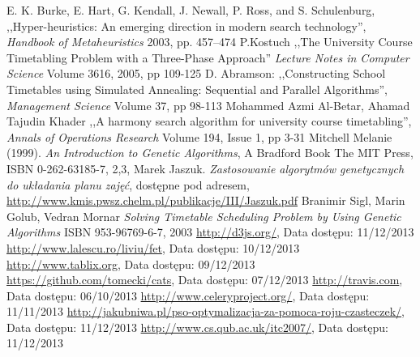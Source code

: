 \documentclass[11pt]{report}
\begin{document}
\begin{thebibliography}{2}
 E. K. Burke, E. Hart, G. Kendall, J. Newall, P. Ross, and S. Schulenburg, ,,Hyper-heuristics: An emerging direction in modern search technology'', \emph{Handbook of Metaheuristics } 2003, pp. 457–474
 P.Kostuch ,,The University Course Timetabling Problem with a Three-Phase Approach'' \emph{
Lecture Notes in Computer Science} Volume 3616, 2005, pp 109-125
 D. Abramson: ,,Constructing School Timetables using Simulated Annealing: Sequential and Parallel Algorithms'', \emph{Management Science} Volume 37, pp 98-113
  Mohammed Azmi Al-Betar, Ahamad Tajudin Khader ,,A harmony search algorithm for university course timetabling'',  
\emph{Annals of Operations Research} Volume 194, Issue 1, pp 3-31 
 Mitchell Melanie (1999). \emph{An Introduction to Genetic Algorithms}, A Bradford Book The MIT Press, ISBN 0-262-63185-7, 2,3,
 Marek Jaszuk. \emph{Zastosowanie algorytmów genetycznych do układania planu zajęć}, dostępne pod adresem, \url{http://www.kmis.pwsz.chelm.pl/publikacje/III/Jaszuk.pdf}
 Branimir Sigl, Marin Golub, Vedran Mornar \emph{Solving Timetable Scheduling Problem by Using Genetic Algorithms} ISBN 953-96769-6-7, 2003
 \url{http://d3js.org/}, Data dostępu: 11/12/2013
 \url{http://www.lalescu.ro/liviu/fet}, Data dostępu: 10/12/2013
 \url{http://www.tablix.org}, Data dostępu: 09/12/2013
 \url{https://github.com/tomecki/cats}, Data dostępu: 07/12/2013
 \url{http://travis.com}, Data dostępu: 06/10/2013
 \url{http://www.celeryproject.org/}, Data dostępu: 11/11/2013
 \url{http://jakubniwa.pl/pso-optymalizacja-za-pomoca-roju-czasteczek/}, Data dostępu: 11/12/2013
 \url{http://www.cs.qub.ac.uk/itc2007/}, Data dostępu: 11/12/2013
\end{thebibliography}
\end{document}
